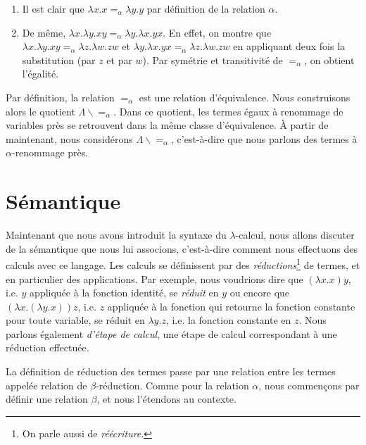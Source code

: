\begin{exemple}
  \begin{enumerate}
    \item Il est clair que $\lambda x . x =_{\alpha} \lambda y . y$ par
    définition de la relation $\alpha$.
    \item De même, $\lambda x . \lambda y . x y =_{\alpha} \lambda y . \lambda x
      . y x$. En
      effet, on montre que $\lambda x . \lambda y . x y =_{\alpha} \lambda z .
      \lambda w. z
      w$ et $\lambda y . \lambda x . y x =_{\alpha} \lambda z . \lambda w . z w$ en appliquant
      deux fois la substitution (par $z$ et par $w$). Par symétrie
      et transitivité de $=_{\alpha}$, on obtient l'égalité.
  \end{enumerate}
\end{exemple}

Par définition, la relation $=_{\alpha}$ est une relation d'équivalence. Nous
construisons alors le quotient $\Lambda \backslash =_{\alpha}$. Dans ce
quotient, les termes égaux à renommage de variables près se retrouvent dans la
même classe d'équivalence. À partir de maintenant, nous considérons $\Lambda
\backslash =_{\alpha}$, c'est-à-dire que nous parlons des termes à $\alpha$-renommage près.

\section{Sémantique}

Maintenant que nous avons introduit la syntaxe du $\lambda$-calcul, nous allons
discuter de la sémantique que nous lui associons, c'est-à-dire comment nous
effectuons des calculs avec ce langage. Les calculs
se définissent par des \textit{réductions}\footnote{On parle aussi de
\textit{réécriture}.} de termes, et en particulier des applications. Par exemple,
nous voudrions dire que $(\lambda x . x) y$, i.e. $y$ appliquée à la fonction
identité, se \textit{réduit} en $y$ ou encore que $(\lambda x . (\lambda y . x))
z$, i.e. $z$ appliquée à la fonction qui retourne la fonction constante pour
toute variable, se réduit en $\lambda y . z$, i.e. la fonction
constante en $z$. Nous parlons également \textit{d'étape de calcul}, une étape
de calcul correspondant à une réduction effectuée.

La définition de réduction des termes passe par une relation entre les
termes appelée relation de $\beta$-réduction.
Comme pour la relation $\alpha$, nous commençons par définir une relation
$\beta$, et nous l'étendons au contexte.

